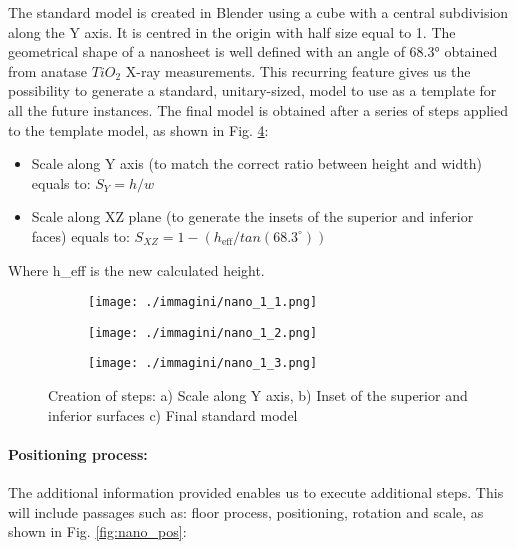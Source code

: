 The standard model is created in Blender using a cube with a central subdivision along the Y axis. It is centred in the origin with half size equal to 1. The geometrical shape of a nanosheet is well defined \cite{angleTIO2} with an angle of 68.3° obtained from anatase $TiO_2$ X-ray measurements. This recurring feature gives us the possibility to generate a standard, unitary-sized, model to use as a template for all the future instances.
The final model is obtained after a series of steps applied to the template model, as shown in Fig. \ref{fig:nano_creation}:
%
\begin{itemize}
    \item Scale along Y axis (to match the correct ratio between height and width) equals to: $S_Y = h / w$
    \item Scale along XZ plane (to generate the insets of the superior and inferior faces) equals to: $S_{XZ} = 1 - (h_{\text{eff}} / tan(68.3^{\circ}))$
\end{itemize}
%
Where h\_eff is the new calculated height.

\begin{figure}[ht]
    \centering
    \begin{subfigure}[b]{0.3\textwidth}
        \texttt{[image: ./immagini/nano\_1\_1.png]}
        \caption{}
        \label{fig:nano_creation_a}
    \end{subfigure}
    \hfill
    \begin{subfigure}[b]{0.3\textwidth}
        \texttt{[image: ./immagini/nano\_1\_2.png]}
        \caption{}
        \label{fig:nano_creation_b}
    \end{subfigure}
    \hfill
    \begin{subfigure}[b]{0.3\textwidth}
        \texttt{[image: ./immagini/nano\_1\_3.png]}
        \caption{}
        \label{fig:nano_creation_c}
    \end{subfigure}
    \caption{Creation of steps: a) Scale along Y axis, b) Inset of the superior and inferior surfaces c) Final standard model}
    \label{fig:nano_creation}
\end{figure}

\paragraph{Positioning process: }

The additional information provided enables us to execute additional steps. This will include passages such as: floor process, positioning, rotation and scale, as shown in Fig. \ref{fig:nano_pos}:


